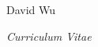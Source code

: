 \documentclass[paper=a4paper,fontsize=11pt]{scrartcl}
\newcommand{\usingfont}[2]{#1 #2 \par \normalsize \normalfont}
\begin{document}
\usingfont{\Huge {}}{\hfill David Wu}
\usingfont{\large {}}{\hfill \textit{Curriculum Vitae}}
\end{document}
